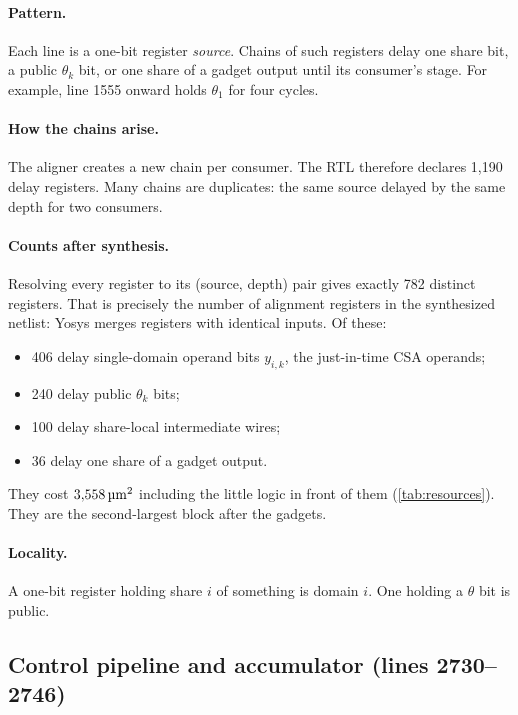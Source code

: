 \paragraph{Pattern.} Each line is a one-bit register \emph{source}. Chains of such registers delay one share bit, a public $\theta_k$ bit, or one share of a gadget output until its consumer's stage. For example, line 1555 onward holds $\theta_1$ for four cycles.

\paragraph{How the chains arise.} The aligner creates a new chain per consumer. The RTL therefore declares 1,190 delay registers. Many chains are duplicates: the same source delayed by the same depth for two consumers.

\paragraph{Counts after synthesis.} Resolving every register to its (source, depth) pair gives exactly 782 distinct registers. That is precisely the number of alignment registers in the synthesized netlist: Yosys merges registers with identical inputs. Of these:
\begin{itemize}
  \item 406 delay single-domain operand bits $y_{i,k}$, the just-in-time CSA operands;
  \item 240 delay public $\theta_k$ bits;
  \item 100 delay share-local intermediate wires;
  \item 36 delay one share of a gadget output.
\end{itemize}
They cost $3{,}558\,\si{\micro\meter\squared}$ including the little logic in front of them (\cref{tab:resources}). They are the second-largest block after the gadgets.

\paragraph{Locality.} A one-bit register holding share $i$ of something is domain $i$. One holding a $\theta$ bit is public.

\subsection{Control pipeline and accumulator (lines 2730--2746)}\label{app:v-acc}

